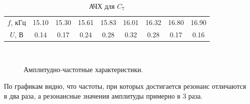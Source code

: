 \documentclass{physlab}
\begin{document}
\begin{table}[H]
	\centering
	\caption{АЧХ для $C_7$}
	\label{table2.2}
	\begin{tabular}{c|c c c c c c c c}
		\toprule
		$f$, кГц & 15.10 & 15.30 & 15.61 & 15.83 & 16.01   & 16.32 & 16.80 & 16.90 \\ 
		$U$, В   & 0.14 & 0.17 & 0.24 & 0.28 & 0.32 & 0.28 & 0.17 & 0.16 \\ \bottomrule
	\end{tabular}
\end{table}

\begin{figure}[H]
	\begin{minipage}[H]{0.49\linewidth}
	\end{minipage}
	~
	\begin{minipage}[h]{0.49\linewidth}
	\end{minipage}
	\caption{Амплитудно-частотные характеристики.}
	\label{ris:image2}
\end{figure}
По графикам видно, что частоты, при которых достигается резонанс отличаются в два раза, а резонансные значения амплитуды примерно в 3 раза.
\end{document}
